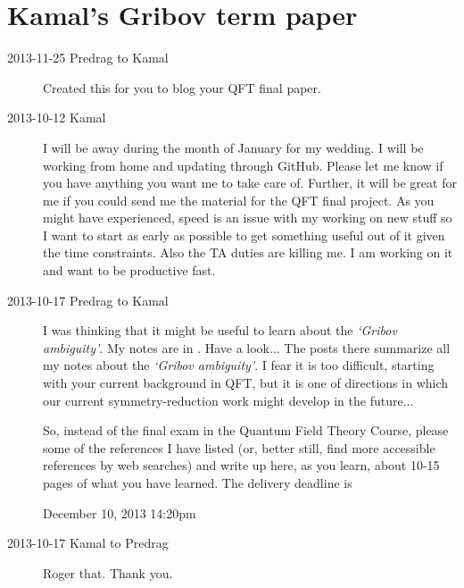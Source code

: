 
\chapter{Kamal's Gribov term paper}
\label{c-dailyBlogKS}

\begin{description}
\item[2013-11-25  Predrag to Kamal] Created this for you to blog
your QFT final paper.

\item[2013-10-12  Kamal] I will be away during the month of January for my wedding.
I will be working from home and updating through GitHub.
Please let me know if you have anything you want me to take care of.
Further, it will be great for me if you could send me the material
for the QFT final project. As you might have experienced, speed is
an issue with my working on new stuff so I want to start as early
as possible to get something useful out of it given the time constraints.
Also the TA duties are killing me. I am working on it and want to be productive fast.

\item[2013-10-17 Predrag to Kamal] I was thinking that it might be useful
to learn about the \emph{`Gribov ambiguity'}. My notes are in
. Have a look... The posts there summarize all my notes
about the \emph{`Gribov ambiguity'}. I fear it is too difficult, starting
with your current background in QFT, but it is one of directions in which
our current symmetry-reduction work might develop in the future...

So, instead of the final exam in the Quantum Field Theory Course, please
some of the references I have listed (or, better still, find more accessible
references by web searches) and write up here, as you learn, about 10-15
pages of what you have learned. The delivery deadline is

\begin{center}
{\large December 10, 2013 14:20pm}
\end{center}

\item[2013-10-17 Kamal to Predrag] Roger that. Thank you.

\end{description}
\renewcommand{\ssp}{a}
